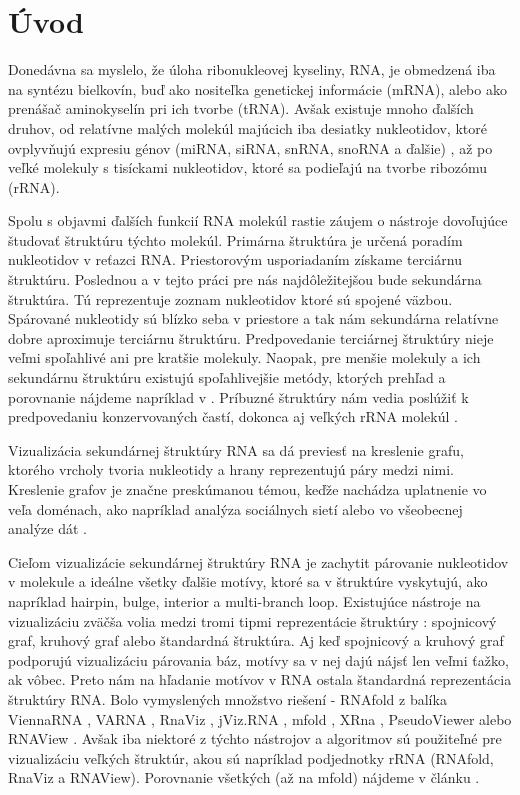 
\chapter*{Úvod}

Donedávna sa myslelo, že úloha ribonukleovej kyseliny, RNA, je obmedzená
iba na syntézu bielkovín, buď ako nositeľka genetickej informácie (mRNA),
alebo ako prenášač aminokyselín pri ich tvorbe (tRNA).
Avšak existuje mnoho ďalších druhov, od relatívne malých molekúl majúcich
iba desiatky nukleotidov, ktoré ovplyvňujú expresiu génov
(miRNA, siRNA, snRNA, snoRNA a ďalšie)  ,
až po veľké molekuly s tisíckami nukleotidov, ktoré sa podieľajú na tvorbe ribozómu (rRNA).

Spolu s objavmi ďalších funkcií RNA molekúl rastie záujem o nástroje dovoľujúce
študovať štruktúru týchto molekúl.
Primárna štruktúra je určená poradím nukleotidov v reťazci RNA. Priestorovým usporiadaním
získame terciárnu štruktúru. Poslednou a v tejto práci pre nás najdôležitejšou
bude sekundárna štruktúra. Tú reprezentuje zoznam nukleotidov ktoré sú spojené väzbou.
Spárované nukleotidy sú blízko seba v priestore a tak nám sekundárna relatívne
dobre aproximuje terciárnu štruktúru. Predpovedanie terciárnej štruktúry nieje veľmi
spoľahlivé ani pre kratšie molekuly. Naopak, pre menšie molekuly a ich  sekundárnu
štruktúru existujú spoľahlivejšie metódy, ktorých prehľad a porovnanie nájdeme napríklad
v .
Príbuzné štruktúry nám vedia poslúžiť k predpovedaniu konzervovaných častí, dokonca
aj veľkých rRNA molekúl .

Vizualizácia sekundárnej štruktúry RNA sa dá previesť na kreslenie grafu,
ktorého vrcholy tvoria nukleotidy a hrany reprezentujú páry medzi nimi.
Kreslenie grafov je značne preskúmanou témou, keďže nachádza uplatnenie vo veľa
doménach, ako napríklad analýza sociálnych sietí 
alebo vo všeobecnej analýze dát .

Cieľom vizualizácie sekundárnej štruktúry RNA je zachytit párovanie nukleotidov
v molekule a ideálne všetky ďalšie motívy, ktoré sa v štruktúre vyskytujú,
ako napríklad hairpin, bulge, interior a multi-branch loop.
Existujúce nástroje na vizualizáciu zväčša volia medzi tromi tipmi reprezentácie
štruktúry : spojnicový graf, kruhový graf alebo štandardná štruktúra.
Aj keď spojnicový a kruhový graf podporujú vizualizáciu párovania báz, motívy
sa v nej dajú nájsť len veľmi ťažko, ak vôbec.
Preto nám na hľadanie motívov v RNA ostala štandardná reprezentácia štruktúry RNA.
Bolo vymyslených množstvo riešení -
RNAfold z balíka ViennaRNA , VARNA ,
RnaViz , jViz.RNA , mfold ,
XRna , PseudoViewer  alebo
RNAView .
Avšak iba niektoré z týchto nástrojov a algoritmov sú použiteľné pre vizualizáciu
veľkých štruktúr, akou sú napríklad podjednotky rRNA (RNAfold, RnaViz a RNAView).
Porovnanie všetkých (až na mfold) nájdeme v článku .

